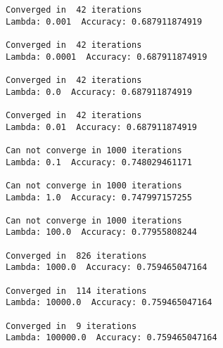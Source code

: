 \begin{itemize}
\begin{verbatim}
Converged in  42 iterations
Lambda: 0.001  Accuracy: 0.687911874919 

Converged in  42 iterations
Lambda: 0.0001  Accuracy: 0.687911874919 

Converged in  42 iterations
Lambda: 0.0  Accuracy: 0.687911874919 

Converged in  42 iterations
Lambda: 0.01  Accuracy: 0.687911874919 

Can not converge in 1000 iterations
Lambda: 0.1  Accuracy: 0.748029461171 

Can not converge in 1000 iterations
Lambda: 1.0  Accuracy: 0.747997157255 

Can not converge in 1000 iterations
Lambda: 100.0  Accuracy: 0.77955808244 

Converged in  826 iterations
Lambda: 1000.0  Accuracy: 0.759465047164 

Converged in  114 iterations
Lambda: 10000.0  Accuracy: 0.759465047164 

Converged in  9 iterations
Lambda: 100000.0  Accuracy: 0.759465047164 
\end{verbatim}






\end{itemize}

